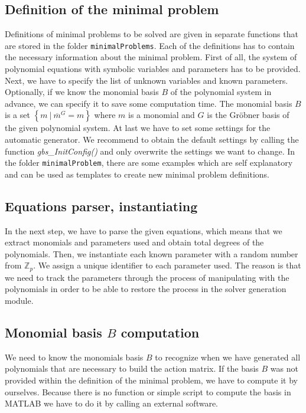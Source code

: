 \subsection{Definition of the minimal problem}
\label{subsec:MinimalProblemDefinition}
Definitions of minimal problems to be solved are given in separate functions that are stored in the folder \texttt{minimalProblems}. Each of the definitions has to contain the necessary information about the minimal problem. First of all, the system of polynomial equations with symbolic variables and parameters has to be provided. Next, we have to specify the list of unknown variables and known parameters. Optionally, if we know the monomial basis $B$ of the polynomial system in advance, we can specify it to save some computation time. The monomial basis $B$ is a set $\left\{m\ |\ \overline{m}^G = m\right\}$ where $m$ is a monomial and $G$ is the Gr\"obner basis of the given polynomial system. At last we have to set some settings for the automatic generator. We recommend to obtain the default settings by calling the function \textit{gbs\_InitConfig()} and only overwrite the settings we want to change. In the folder \texttt{minimalProblem}, there are some examples which are self explanatory and can be used as templates to create new minimal problem definitions.

\subsection{Equations parser, instantiating}
In the next step, we have to parse the given equations, which means that we extract monomials and parameters used and obtain total degrees of the polynomials. Then, we instantiate each known parameter with a random number from $\mathbb{Z}_p$. We assign a unique identifier to each parameter used. The reason is that we need to track the parameters through the process of manipulating with the polynomials in order to be able to restore the process in the solver generation module.

\subsection{Monomial basis $B$ computation}
We need to know the monomials basis $B$ to recognize when we have generated all polynomials that are necessary to build the action matrix. If the basis $B$ was not provided within the definition of the minimal problem, we have to compute it by ourselves. Because there is no function or simple script to compute the basis in MATLAB we have to do it by calling an external software.

